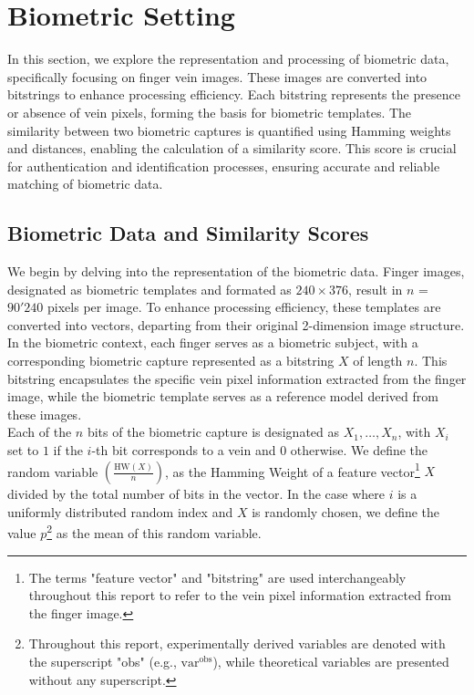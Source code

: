 

\section{Biometric Setting}
\label{sec:bio_setting}

In this section, we explore the representation and processing of biometric data, specifically focusing on finger vein images. These images are converted into bitstrings to enhance processing efficiency. Each bitstring represents the presence or absence of vein pixels, forming the basis for biometric templates. The similarity between two biometric captures is quantified using Hamming weights and distances, enabling the calculation of a similarity score. This score is crucial for authentication and identification processes, ensuring accurate and reliable matching of biometric data.

\subsection{Biometric Data and Similarity Scores}
\label{Bio_data_sim_scores}
We begin by delving into the representation of the biometric data. Finger images, designated as biometric templates and formated as \(240 \times 376\), result in \(n\) = \(90'240\) pixels per image. To enhance processing efficiency, these templates are converted into vectors, departing from their original 2-dimension image structure. In the biometric context, each finger serves as a biometric subject, with a corresponding biometric capture represented as a bitstring \(X\) of length \(n\). This bitstring encapsulates the specific vein pixel information extracted from the finger image, while the biometric template serves as a reference model derived from these images. \\

Each of the \(n\) bits of the biometric capture is designated as \(X_1, \ldots, X_n\), with \(X_i\) set to \(1\) if the \(i\)-th bit corresponds to a vein and \(0\) otherwise. We define the random variable \(\left( \frac{\text{HW}(X)}{n} \right)\), as the Hamming Weight of a feature vector\footnote{The terms "feature vector" and "bitstring" are used interchangeably throughout this report to refer to the vein pixel information extracted from the finger image.} \(X\) divided by the total number of bits in the vector. In the case where \(i\) is a uniformly distributed random index and \(X\) is randomly chosen, we define the value \(p\)\footnote{Throughout this report, experimentally derived variables are denoted with the superscript "obs" (e.g., \(\text{var}^{\text{obs}}\)), while theoretical variables are presented without any superscript.} as the mean of this random variable.

